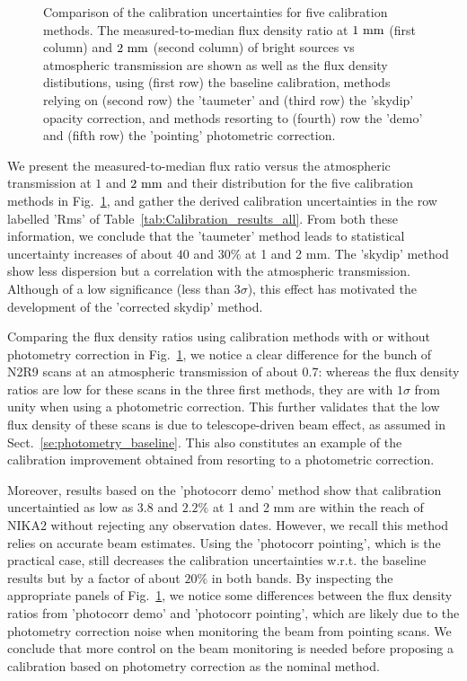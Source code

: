 \begin{figure}[ht!]
\begin{center}
    \caption[Comparison of calibration rms errors]{Comparison of the calibration uncertainties for five calibration methods. The
      measured-to-median flux density ratio at $1~\rm{mm}$ (first column) and $2~\rm{mm}$ (second column) of bright sources vs
      atmospheric transmission are shown as well as the flux density distibutions, using (first row) the baseline calibration, methods relying on (second row) the 'taumeter' and (third row) the 'skydip' opacity correction, and methods resorting to (fourth) row the 'demo' and (fifth row) the 'pointing' photometric correction.}
    \label{fig:allbright_rms_others}
  \end{center}
\end{figure}

We present the measured-to-median flux ratio versus the atmospheric
transmission at $1$ and $2~\rm{mm}$ and their distribution for the
five calibration methods in Fig.~\ref{fig:allbright_rms_others}, and
gather the derived calibration uncertainties in the row labelled 'Rms'
of Table~\ref{tab:Calibration_results_all}. From both these
information, we conclude that the 'taumeter' method leads to 
statistical uncertainty increases of about $40$ and $30\%$ at 1 and 2
mm. The 'skydip' method show less dispersion but a correlation with
the atmospheric transmission. Although of a low significance (less
than $3\sigma$), this effect has motivated the development of the
'corrected skydip' method.

Comparing the flux density ratios using calibration methods with or
without photometry correction in Fig.~\ref{fig:allbright_rms_others},
we notice a clear difference for the bunch of N2R9 scans at an
atmospheric transmission of about 0.7: whereas the flux density ratios
are low for these scans in the three first methods, they are with
$1\sigma$ from unity when using a photometric correction. This further
validates that the low flux density of these scans is due to
telescope-driven beam effect, as assumed in
Sect.~\ref{se:photometry_baseline}. This also constitutes an example
of the calibration improvement obtained from resorting to a
photometric correction.

Moreover, results based on the 'photocorr demo' method show that calibration
uncertaintied as low as $3.8$ and $2.2\%$
at 1 and 2 mm are within the reach of NIKA2 without rejecting any
observation dates. However, we recall this method relies on 
accurate beam estimates. Using the 'photocorr pointing', which is the
practical case, still decreases the calibration uncertainties
w.r.t. the baseline results but by a factor of about $20\%$ in both
bands. By inspecting the appropriate panels of
Fig.~\ref{fig:allbright_rms_others}, we notice some differences between
the flux density ratios from 'photocorr demo' and 'photocorr
pointing', which are likely due to the photometry correction noise
when monitoring the beam from pointing scans. We conclude that more
control on the beam monitoring is needed before proposing a calibration
based on photometry correction as the nominal method.


